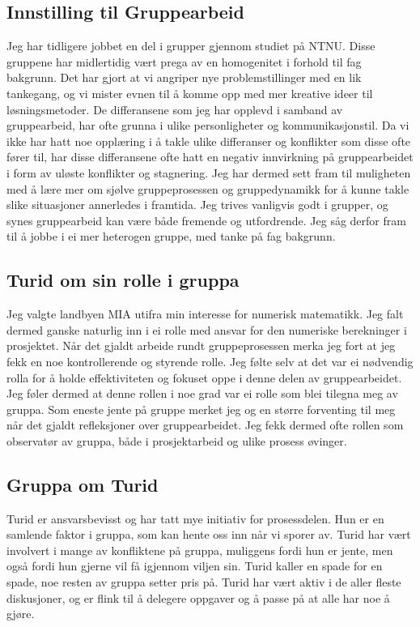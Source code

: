 \subsection*{Innstilling til Gruppearbeid}
Jeg har tidligere jobbet en del i grupper gjennom studiet på NTNU. Disse gruppene har midlertidig vært prega av en homogenitet i forhold til fag bakgrunn. Det har gjort at vi angriper nye problemstillinger med en lik tankegang, og vi mister evnen til å komme opp med mer kreative ideer til løsningsmetoder. De differansene som jeg har opplevd i samband av gruppearbeid, har ofte grunna i ulike personligheter og kommunikasjonstil. Da vi ikke har hatt noe opplæring i å takle ulike differanser og konflikter som disse ofte fører til, har disse differansene ofte hatt en negativ innvirkning på gruppearbeidet i form av uløste konflikter og stagnering. Jeg har dermed sett fram til muligheten med å lære mer om sjølve gruppeprosessen og gruppedynamikk for å kunne takle slike situasjoner annerledes i framtida. Jeg trives vanligvis godt i grupper, og synes gruppearbeid kan være både fremende og utfordrende.  Jeg såg derfor fram til å jobbe i ei mer heterogen gruppe, med tanke på fag bakgrunn.


\subsection*{Turid om sin rolle i gruppa}

Jeg valgte landbyen MIA utifra min interesse for numerisk matematikk. Jeg falt dermed ganske naturlig inn i ei rolle med ansvar for den numeriske berekninger i prosjektet. Når det gjaldt arbeide rundt gruppeprosessen merka jeg fort at jeg fekk en noe kontrollerende og styrende rolle. Jeg følte selv at det var ei nødvendig  rolla for å holde effektiviteten og fokuset oppe i denne delen av gruppearbeidet. Jeg føler dermed at denne rollen i noe grad var ei rolle som blei tilegna meg av gruppa. Som eneste jente på gruppe merket jeg og en større forventing til meg når det gjaldt refleksjoner over gruppearbeidet. Jeg fekk dermed ofte rollen som observatør av gruppa, både i prosjektarbeid og ulike prosess øvinger. 

\subsection*{Gruppa om Turid}
Turid er ansvarsbevisst og har tatt mye initiativ for prosessdelen. Hun er en
samlende faktor i gruppa, som kan hente oss inn når vi sporer av. Turid har vært
involvert i mange av konfliktene på gruppa, muliggens fordi hun er jente,
men også fordi hun gjerne vil få igjennom viljen sin. Turid kaller en spade for
en spade, noe resten av gruppa setter pris på. Turid har vært aktiv i de aller
fleste diskusjoner, og er flink til å delegere oppgaver og å passe på at alle
har noe å gjøre.

